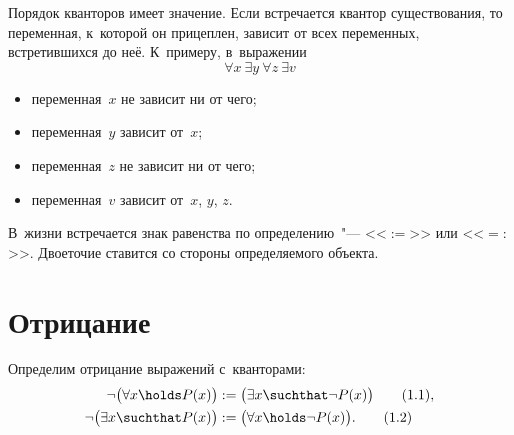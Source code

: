 \begin{note}
	Порядок кванторов имеет значение. Если встречается квантор существования, то
	переменная, к~которой он прицеплен, зависит от всех переменных, встретившихся
	до неё. К~примеру, в~выражении
	\[
		\forall x\ 
		\exists y\ 
		\forall z\ 
		\exists v
	\]
	\begin{itemize}
		\item переменная~$x$ не зависит ни от чего;
		\item переменная~$y$ зависит от~$x$;
		\item переменная~$z$ не зависит ни от чего;
		\item переменная~$v$ зависит от~$x$, $y$, $z$.
	\end{itemize}
\end{note}

\begin{note}
	В~жизни встречается знак равенства по определению~"--- <<$:=$>> или <<$=:$>>.
	Двоеточие ставится со стороны определяемого объекта.
\end{note}

\section{Отрицание}

\begin{definition}
	\label{def:neg_quantors_simple}
	Определим отрицание выражений с~кванторами:
	\begin{align*}
		\neg
		\bigl(
			\forall x
			\holds
			P(x)
		\bigr)
		&:=
		\bigl(
			\exists x
			\suchthat
			\neg
			P(x)
		\bigr)
		\refstepcounter{equation}
		\tag{\theequation.1}
		\label{eq:sets:forall:x}
		,
		\\
		\neg
		\bigl(
			\exists x
			\suchthat
			P(x)
		\bigr)
		&:=
		\bigl(
			\forall x
			\holds
			\neg
			P(x)
		\bigr)
		.
		\tag{\theequation.2}
		\label{eq:sets:forall:x}
	\end{align*}
\end{definition}
